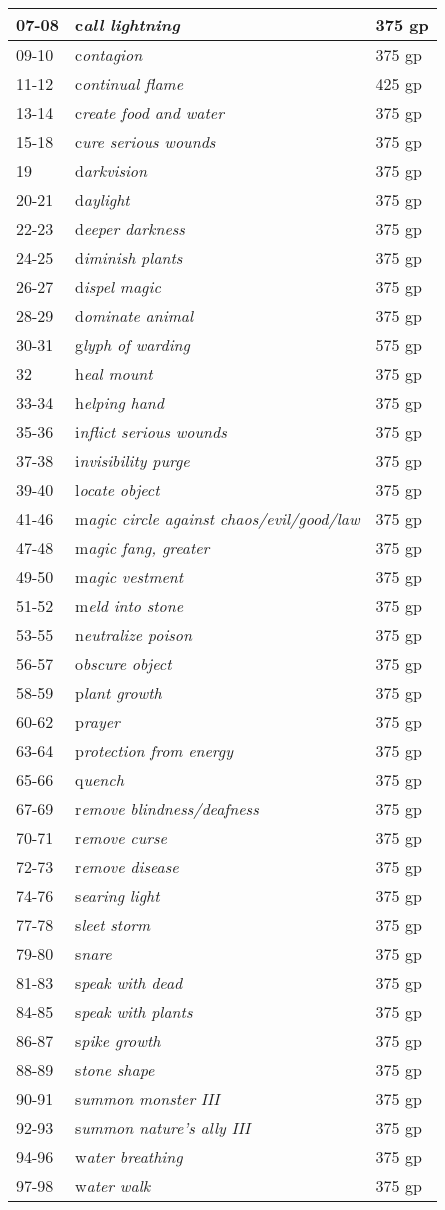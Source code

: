 \documentclass{article}
\begin{document}
\begin{tabular}{|>{\raggedright}p{29pt}|>{\raggedright}p{138pt}|>{\raggedright}p{147pt}|}
\hline
07-08 & c\textit{all lightning} & 375 gp\tabularnewline
\hline
09-10 & c\textit{ontagion} & 375 gp\tabularnewline
\hline
11-12 & c\textit{ontinual flame} & 425 gp\tabularnewline
\hline
13-14 & c\textit{reate food and water} & 375 gp\tabularnewline
\hline
15-18 & c\textit{ure serious wounds} & 375 gp\tabularnewline
\hline
19 & d\textit{arkvision} & 375 gp\tabularnewline
\hline
20-21 & d\textit{aylight} & 375 gp\tabularnewline
\hline
22-23 & d\textit{eeper darkness} & 375 gp\tabularnewline
\hline
24-25 & d\textit{iminish plants} & 375 gp\tabularnewline
\hline
26-27 & d\textit{ispel magic} & 375 gp\tabularnewline
\hline
28-29 & d\textit{ominate animal} & 375 gp\tabularnewline
\hline
30-31 & g\textit{lyph of warding} & 575 gp\tabularnewline
\hline
32 & h\textit{eal mount} & 375 gp\tabularnewline
\hline
33-34 & h\textit{elping hand} & 375 gp\tabularnewline
\hline
35-36 & i\textit{nflict serious wounds} & 375 gp\tabularnewline
\hline
37-38 & i\textit{nvisibility purge} & 375 gp\tabularnewline
\hline
39-40 & l\textit{ocate object} & 375 gp\tabularnewline
\hline
41-46 & m\textit{agic circle against chaos/evil/good/law} & 375 gp\tabularnewline
\hline
47-48 & m\textit{agic fang, greater} & 375 gp\tabularnewline
\hline
49-50 & m\textit{agic vestment} & 375 gp\tabularnewline
\hline
51-52 & m\textit{eld into stone} & 375 gp\tabularnewline
\hline
53-55 & n\textit{eutralize poison} & 375 gp\tabularnewline
\hline
56-57 & o\textit{bscure object} & 375 gp\tabularnewline
\hline
58-59 & p\textit{lant growth} & 375 gp\tabularnewline
\hline
60-62 & p\textit{rayer} & 375 gp\tabularnewline
\hline
63-64 & p\textit{rotection from energy} & 375 gp\tabularnewline
\hline
65-66 & q\textit{uench} & 375 gp\tabularnewline
\hline
67-69 & r\textit{emove blindness/deafness} & 375 gp\tabularnewline
\hline
70-71 & r\textit{emove curse} & 375 gp\tabularnewline
\hline
72-73 & r\textit{emove disease} & 375 gp\tabularnewline
\hline
74-76 & s\textit{earing light} & 375 gp\tabularnewline
\hline
77-78 & s\textit{leet storm} & 375 gp\tabularnewline
\hline
79-80 & s\textit{nare} & 375 gp\tabularnewline
\hline
81-83 & s\textit{peak with dead} & 375 gp\tabularnewline
\hline
84-85 & s\textit{peak with plants} & 375 gp\tabularnewline
\hline
86-87 & s\textit{pike growth} & 375 gp\tabularnewline
\hline
88-89 & s\textit{tone shape} & 375 gp\tabularnewline
\hline
90-91 & s\textit{ummon monster III} & 375 gp\tabularnewline
\hline
92-93 & s\textit{ummon nature's ally III} & 375 gp\tabularnewline
\hline
94-96 & w\textit{ater breathing} & 375 gp\tabularnewline
\hline
97-98 & w\textit{ater walk} & 375 gp\tabularnewline

\end{tabular}
\end{document}
